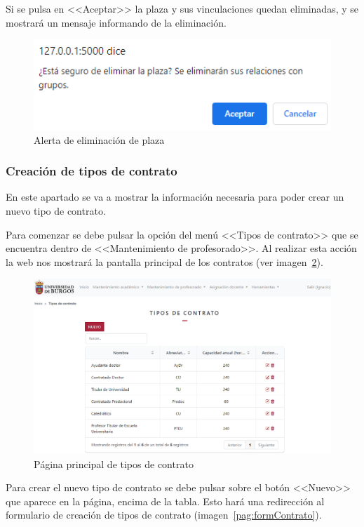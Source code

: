 Si se pulsa en <<Aceptar>> la plaza y sus vinculaciones quedan eliminadas, y se mostrará un mensaje informando de la eliminación.

\begin{figure}
	\centering
	\includegraphics[width=.5\textwidth]{../img/Anexos/Manual usuario/alertElPlaza.png}
	\caption{Alerta de eliminación de plaza}\label{pag:alertElPlaza}
\end{figure}

\subsubsection{Creación de tipos de contrato}
En este apartado se va a mostrar la información necesaria para poder crear un nuevo tipo de contrato.

Para comenzar se debe pulsar la opción del menú <<Tipos de contrato>> que se encuentra dentro de <<Mantenimiento de profesorado>>.
Al realizar esta acción la web nos mostrará la pantalla principal de los contratos (ver imagen~\ref{pag:contratos}).

\begin{figure}
	\centering
	\includegraphics[width=\textwidth]{../img/Anexos/Manual usuario/contratos.png}
	\caption{Página principal de tipos de contrato}\label{pag:contratos}
\end{figure}

Para crear el nuevo tipo de contrato se debe pulsar sobre el botón <<Nuevo>> que aparece en la página, encima de la tabla.
Esto hará una redirección al formulario de creación de tipos de contrato (imagen~\ref{pag:formContrato}).

